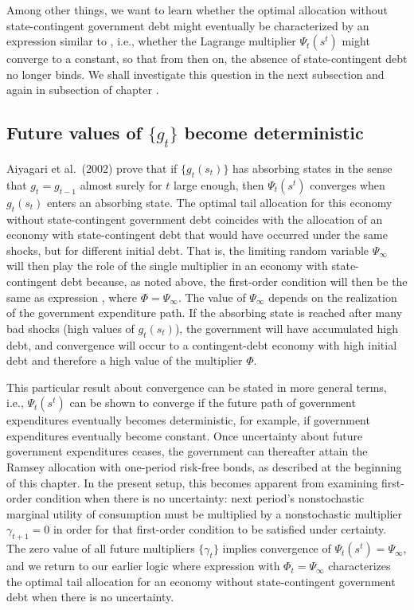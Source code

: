 Among other things, we want  to learn
whether  the optimal allocation without state-contingent government debt
might eventually be characterized by an
expression similar to ,
i.e., whether the Lagrange multiplier $\Psi_t(s^t)$ might converge
to a constant, so that from then on, the absence of state-contingent
debt no longer binds.  We shall investigate this question in the next subsection and
again in subsection  of chapter .


\subsection{Future values of $\{g_t\}$ become deterministic}
Aiyagari et al.\ (2002) prove that if $\{g_t(s_t)\}$ has absorbing states
in the sense that $g_t = g_{t-1}$ almost surely for $t$ large enough,
then $\Psi_t(s^t)$ converges when $g_t(s_t)$ enters an absorbing state.
The optimal tail allocation for this economy without state-contingent
government debt coincides with the allocation of an economy with
state-contingent debt that would have occurred under the same
shocks, but for different initial debt. That is, the limiting random
variable $\Psi_\infty$ will then play the role of the single multiplier
in an economy with state-contingent debt because, as noted above,
the first-order condition  will then be the same
as expression , where $\Phi=\Psi_\infty$. The value of $\Psi_\infty$
depends on the realization of the government expenditure path. If the
absorbing state is reached after many bad shocks (high values of
$g_t(s_t)$), the government will have accumulated high debt, and
convergence will occur to a contingent-debt economy with
high initial debt and therefore a high value of the multiplier
$\Phi$.

This particular result about convergence
can be stated in more general terms, i.e., $\Psi_t(s^t)$ can
be shown to converge if the future path of government expenditures
eventually  becomes deterministic, for example, if government expenditures eventually  become
 constant. Once uncertainty about future government expenditures ceases, the
government can thereafter  attain the Ramsey allocation
with one-period risk-free bonds, as described at the beginning of
this chapter. In the present setup, this becomes
apparent from examining first-order condition 
when there is no uncertainty: next period's nonstochastic
marginal utility of consumption must be multiplied
by a nonstochastic multiplier $\gamma_{t+1}=0$ in order for
that first-order condition to be satisfied under certainty.
The zero value of all future multipliers $\{\gamma_t\}$
implies convergence of $\Psi_t(s^t)=\Psi_\infty$, and we return  to our earlier logic where expression 
with $\Phi_t=\Psi_\infty$
characterizes the optimal tail allocation for an
economy without state-contingent government debt when there
is no uncertainty.

